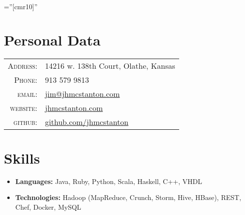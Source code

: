 \documentclass[10pt]{article} %
\begin{document}
\pagestyle{empty} %

\font\fb=''[cmr10]'' %


\par{\bigskip\par} %

\section{Personal Data}

\begin{table}[h]
\centering
\begin{tabular}{rl}
\textsc{Address:} & 14216 w. 138th Court, Olathe, Kansas \\
\textsc{Phone:} & 913 579 9813 \\
\textsc{email:} & \href{mailto:jim@jhmcstanton.com}{jim@jhmcstanton.com}\\
\textsc{website:} & \href{http://www.jhmcstanton.com}{jhmcstanton.com}\\
\textsc{github:} & \href{http://www.github.com/jhmcstanton}{github.com/jhmcstanton}
\end{tabular}
\end{table}


\section{Skills}

\begin{itemize}
\item \textbf{Languages:} Java, Ruby, Python, Scala, Haskell, C++, VHDL
\item \textbf{Technologies:} Hadoop (MapReduce, Crunch, Storm, Hive, HBase), REST, Chef, Docker, MySQL
\end{itemize}
\end{document}

